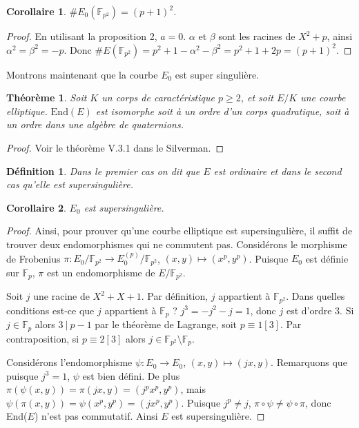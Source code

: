\documentclass{article}
\newtheorem{thm}{Théorème}
\newtheorem{deff}{Définition}
\newtheorem{cor}{Corollaire}
\newcommand{\Fp}{\mathbb{F}_{p}}
\newcommand{\Fq}{\mathbb{F}_{p^2}}
\begin{document}
\begin{cor}
$\#E_0(\Fq) = (p+1)^2$.
\end{cor}

\begin{proof}
  En utilisant la proposition 2, $a = 0$. $\alpha$ et $\beta$ sont les racines de $X^2 + p$, ainsi $\alpha^2 = \beta^2 = -p$. Donc $\#E(\Fq) = p^2 + 1 - \alpha^2 - \beta^2 = p^2 + 1 + 2p = (p+1)^2$.
\end{proof}


Montrons maintenant que la courbe $E_0$ est super singulière.

\begin{thm}
  Soit $K$ un corps de caractéristique $p\ge 2$, et soit $E/K$ une courbe elliptique. $\mathrm{End}(E)$ est isomorphe soit à un ordre d'un corps quadratique, soit à un ordre dans une algèbre de quaternions. 
\end{thm}

\begin{proof}
  Voir le théorème V.3.1 dans le Silverman.
\end{proof}

\begin{deff}
  Dans le premier cas on dit que $E$ est \textit{ordinaire} et dans le second cas qu'elle est \textit{supersingulière}.
\end{deff}

\begin{cor}
  $E_0$ est supersingulière.
\end{cor}

\begin{proof}
Ainsi, pour prouver qu'une courbe elliptique est supersingulière, il suffit de trouver deux endomorphismes qui ne commutent pas.
Considérons le morphisme de Frobenius $\pi : E_0/\Fq \to E_0^{(p)}/\Fq$, $(x, y) \mapsto (x^p, y^p)$. 
Puisque $E_0$ est définie sur $\Fp$, $\pi$ est un endomorphisme de $E/\Fq$.

Soit $j$ une racine de $X^2 + X + 1$. 
Par définition, $j$ appartient à $\Fq$. 
Dans quelles conditions est-ce que $j$ appartient à $\Fp$ ? 
$j^3 = -j^2 -j = 1$, donc $j$ est d'ordre $3$. 
Si $j\in \Fp$ alors $3\ |\ p-1$ par le théorème de Lagrange, soit $p\equiv 1[3]$. 
Par contraposition, si $p \equiv 2 [3]$ alors $j\in\Fq\setminus\Fp$.

Considérons l'endomorphisme $\psi : E_0 \to E_0$, $(x, y) \mapsto (jx, y)$. 
Remarquons que puisque $j^3 = 1$, $\psi$ est bien défini.
De plus $\pi(\psi(x, y)) = \pi(jx, y) = (j^px^p, y^p)$, mais $\psi(\pi(x, y)) = \psi(x^p, y^p) = (jx^p, y^p)$. 
Puisque $j^p\neq j$, $\pi \circ \psi \neq \psi \circ \pi$, donc End($E$) n'est pas commutatif.
Ainsi $E$ est supersingulière.
\end{proof}
\end{document}
